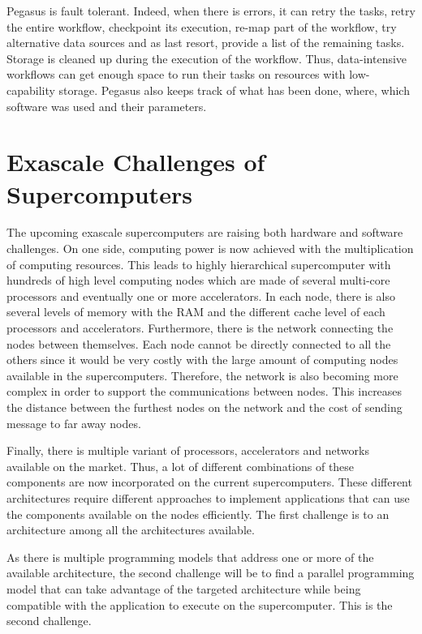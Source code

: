 Pegasus is fault tolerant.
Indeed, when there is errors, it can retry the tasks, retry the entire workflow, checkpoint its execution, re-map part of the workflow, try alternative data sources and as last resort, provide a list of the remaining tasks.
Storage is cleaned up during the execution of the workflow.
Thus, data-intensive workflows can get enough space to run their tasks on resources with low-capability storage.
Pegasus also keeps track of what has been done, where, which software was used and their parameters.


\section{Exascale Challenges of Supercomputers}
The upcoming exascale supercomputers are raising both hardware and software challenges.
On one side, computing power is now achieved with the multiplication of computing resources.
This leads to highly hierarchical supercomputer with hundreds of high level computing nodes which are made of several multi-core processors and eventually one or more accelerators.
In each node, there is also several levels of memory with the RAM and the different cache level of each processors and accelerators.
Furthermore, there is the network connecting the nodes between themselves.
Each node cannot be directly connected to all the others since it would be very costly with the large amount of computing nodes available in the supercomputers.
Therefore, the network is also becoming more complex in order to support the communications between nodes.
This increases the distance between the furthest nodes on the network and the cost of sending message to far away nodes.

Finally, there is multiple variant of processors, accelerators and networks available on the market.
Thus, a lot of different combinations of these components are now incorporated on the current supercomputers.
These different architectures require different approaches to implement applications that can use the components available on the nodes efficiently.
The first challenge is to an architecture among all the architectures available.

As there is multiple programming models that address one or more of the available architecture, the second challenge will be to find a parallel programming model that can take advantage of the targeted architecture while being compatible with the application to execute on the supercomputer.
This is the second challenge.


